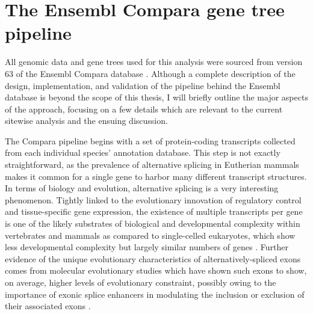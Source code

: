 \section{The Ensembl Compara gene tree pipeline}

All genomic data and gene trees used for this analysis were sourced
from version 63 of the Ensembl Compara database
\citep{Vilella2009,Flicek2011}. Although a complete description of the
design, implementation, and validation of the pipeline behind the
Ensembl database is beyond the scope of this thesis, I will briefly
outline the major aspects of the approach, focusing on a few details
which are relevant to the current sitewise analysis and the ensuing
discussion.

The Compara pipeline begins with a set of protein-coding transcripts
collected from each individual species' annotation database. This step
is not exactly straightforward, as the prevalence of alternative
splicing in Eutherian mammals makes it common for a single gene to
harbor many different transcript structures. In terms of biology and
evolution, alternative splicing is a very interesting
phenomenon. Tightly linked to the evolutionary innovation of
regulatory control and tissue-specific gene expression, the existence
of multiple transcripts per gene is one of the likely substrates of
biological and developmental complexity within vertebrates and mammals
as compared to single-celled eukaryotes, which show less developmental
complexity but largely similar numbers of genes
\citep{Csuros2011}. Further evidence of the unique evolutionary
characteristics of alternatively-spliced exons comes from molecular
evolutionary studies which have shown such exons to show, on average,
higher levels of evolutionary constraint, possibly owing to the
importance of exonic splice enhancers in modulating the inclusion or
exclusion of their associated exons \citep{Parmley2006}.

